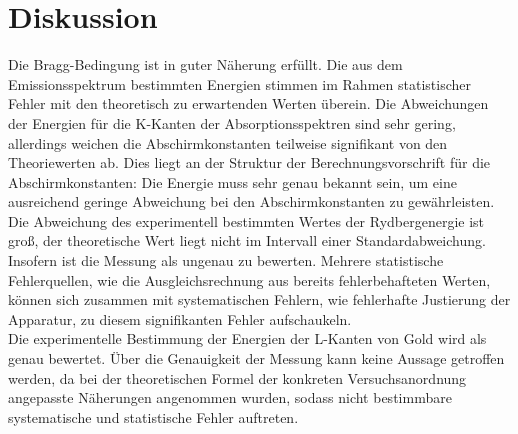
\newpage
\section{Diskussion}
\label{sec:Diskussion}

Die Bragg-Bedingung ist in guter Näherung erfüllt. Die aus dem Emissionsspektrum
bestimmten Energien stimmen im Rahmen statistischer Fehler mit den theoretisch zu erwartenden Werten überein.
Die Abweichungen der Energien für die K-Kanten der Absorptionsspektren sind sehr gering, allerdings
weichen die Abschirmkonstanten teilweise signifikant von den Theoriewerten ab. Dies liegt an
der Struktur der Berechnungsvorschrift für die Abschirmkonstanten: Die Energie muss sehr genau bekannt sein,
um eine ausreichend geringe Abweichung bei den Abschirmkonstanten zu gewährleisten.\\
Die Abweichung des experimentell bestimmten Wertes der Rydbergenergie ist groß, der theoretische Wert
liegt nicht im Intervall einer Standardabweichung. Insofern ist die Messung als ungenau zu bewerten.
Mehrere statistische Fehlerquellen, wie die Ausgleichsrechnung aus bereits fehlerbehafteten Werten, können
sich zusammen mit systematischen Fehlern, wie fehlerhafte Justierung der Apparatur, zu diesem
signifikanten Fehler aufschaukeln.\\
Die experimentelle Bestimmung der Energien der L-Kanten von Gold wird als genau bewertet.
Über die Genauigkeit der Messung kann keine Aussage getroffen werden, da bei der theoretischen Formel
der konkreten Versuchsanordnung angepasste Näherungen angenommen wurden, sodass nicht bestimmbare
systematische und statistische Fehler auftreten.\\
